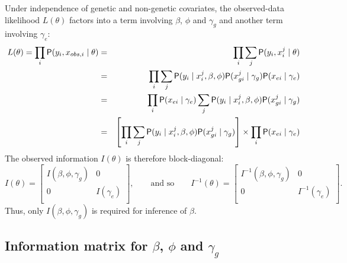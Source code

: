 \documentclass[article, shortnames]{jss}
\begin{document}
Under independence of genetic and non-genetic covariates,
the observed-data likelihood
$L(\theta)$ factors into a term
involving $\beta$, $\phi$ and $\gamma_g$ and another term involving
$\gamma_e$:
\begin{eqnarray*}
L(\theta)  =  \prod_i \mathsf{P}(y_i , x_{obs,i} \mid \theta)
& = & \prod_i \sum_j  \mathsf{P}(y_i , x^j_i \mid \theta) \\
& = & \prod_i \sum_j  \mathsf{P}(y_i \mid x^j_i, \beta, \phi)
      \mathsf{P}(x^j_{gi} \mid \gamma_g) \mathsf{P}(x_{ei} \mid \gamma_e)  \\
& = & \prod_i \mathsf{P}(x_{ei} \mid \gamma_e) \sum_j  
      \mathsf{P}(y_i \mid x^j_i, \beta,\phi)
      \mathsf{P}(x^j_{gi} \mid \gamma_g)  \\
& = & \left[ \prod_i \sum_j  \mathsf{P}(y_i \mid x^j_i, \beta,\phi)
      \mathsf{P}(x^j_{gi} \mid \gamma_g) \right] \times
      \prod_i \mathsf{P}(x_{ei} \mid \gamma_e)
\end{eqnarray*}
The observed information $I(\theta)$
is therefore block-diagonal:
$$
I(\theta) =
\left[ \begin{array}{ll} I(\beta,\phi,\gamma_g) & 0 \\
                                    0 & I(\gamma_e) \\
       \end{array} \right],
\qquad \mbox{and so}
\qquad
I^{-1}(\theta) =
\left[ \begin{array}{ll} I^{-1}(\beta,\phi,\gamma_g) & 0 \\
                                    0 & I^{-1}(\gamma_e) \\
       \end{array} \right].
$$
Thus, only $I(\beta,\phi,\gamma_g)$
is required for inference of $\beta$.


\subsection*{Information matrix for  $\beta$, $\phi$ and $\gamma_g$}
\end{document}
